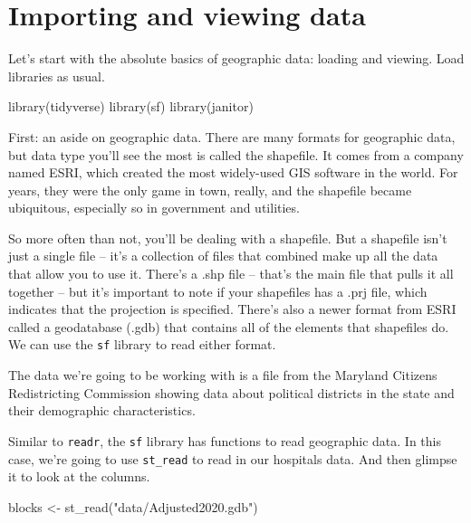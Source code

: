 \documentclass[
  letterpaper,
  DIV=11,
  numbers=noendperiod]{scrreprt}
\newenvironment{Shaded}{\begin{snugshade}}{\end{snugshade}}
\newcommand{\FunctionTok}[1]{\textcolor[rgb]{0.28,0.35,0.67}{#1}}
\newcommand{\NormalTok}[1]{\textcolor[rgb]{0.00,0.23,0.31}{#1}}
\newcommand{\OtherTok}[1]{\textcolor[rgb]{0.00,0.23,0.31}{#1}}
\newcommand{\StringTok}[1]{\textcolor[rgb]{0.13,0.47,0.30}{#1}}
\begin{document}
\hypertarget{importing-and-viewing-data}{%
\section{Importing and viewing data}\label{importing-and-viewing-data}}

Let's start with the absolute basics of geographic data: loading and
viewing. Load libraries as usual.

\begin{Shaded}
\begin{Highlighting}[]
\FunctionTok{library}\NormalTok{(tidyverse)}
\FunctionTok{library}\NormalTok{(sf)}
\FunctionTok{library}\NormalTok{(janitor)}
\end{Highlighting}
\end{Shaded}

First: an aside on geographic data. There are many formats for
geographic data, but data type you'll see the most is called the
shapefile. It comes from a company named ESRI, which created the most
widely-used GIS software in the world. For years, they were the only
game in town, really, and the shapefile became ubiquitous, especially so
in government and utilities.

So more often than not, you'll be dealing with a shapefile. But a
shapefile isn't just a single file -- it's a collection of files that
combined make up all the data that allow you to use it. There's a .shp
file -- that's the main file that pulls it all together -- but it's
important to note if your shapefiles has a .prj file, which indicates
that the projection is specified. There's also a newer format from ESRI
called a geodatabase (.gdb) that contains all of the elements that
shapefiles do. We can use the \texttt{sf} library to read either format.

The data we're going to be working with is a file from the Maryland
Citizens Redistricting Commission showing data about political districts
in the state and their demographic characteristics.

Similar to \texttt{readr}, the \texttt{sf} library has functions to read
geographic data. In this case, we're going to use \texttt{st\_read} to
read in our hospitals data. And then glimpse it to look at the columns.

\begin{Shaded}
\begin{Highlighting}[]
\NormalTok{blocks }\OtherTok{\textless{}{-}} \FunctionTok{st\_read}\NormalTok{(}\StringTok{"data/Adjusted2020.gdb"}\NormalTok{)}
\end{Highlighting}
\end{Shaded}
\end{document}
